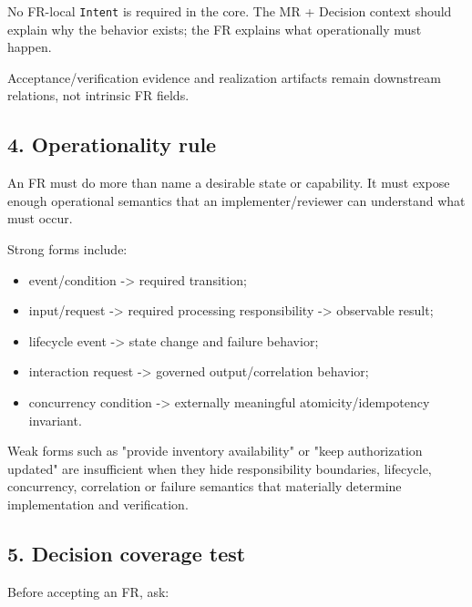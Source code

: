 \documentclass[
  10pt,
]{article}
\providecommand{\tightlist}{%
  \setlength{\itemsep}{0pt}\setlength{\parskip}{0pt}}
\begin{document}
No FR-local \texttt{Intent} is required in the core. The MR + Decision
context should explain why the behavior exists; the FR explains what
operationally must happen.

Acceptance/verification evidence and realization artifacts remain
downstream relations, not intrinsic FR fields.

\subsection{4. Operationality rule}\label{4-operationality-rule}

An FR must do more than name a desirable state or capability. It must
expose enough operational semantics that an implementer/reviewer can
understand what must occur.

Strong forms include:

\begin{itemize}
\tightlist
\item
  event/condition -\textgreater{} required transition;
\item
  input/request -\textgreater{} required processing responsibility
  -\textgreater{} observable result;
\item
  lifecycle event -\textgreater{} state change and failure behavior;
\item
  interaction request -\textgreater{} governed output/correlation
  behavior;
\item
  concurrency condition -\textgreater{} externally meaningful
  atomicity/idempotency invariant.
\end{itemize}

Weak forms such as "provide inventory availability" or "keep
authorization updated" are insufficient when they hide responsibility
boundaries, lifecycle, concurrency, correlation or failure semantics
that materially determine implementation and verification.

\subsection{5. Decision coverage test}\label{5-decision-coverage-test}

Before accepting an FR, ask:
\end{document}
